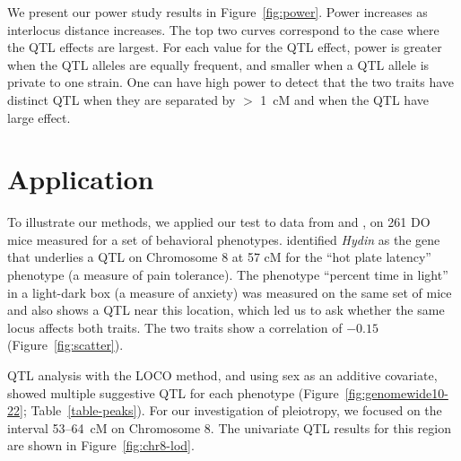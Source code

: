 \documentclass[12pt,twoside, lineno]{gsajnl}
\begin{document}
We present our power study results in Figure~\ref{fig:power}.
Power increases as interlocus distance increases. The top two curves
correspond to the case where the QTL effects are largest. For each value
for the QTL effect, power is greater when the QTL alleles are equally
frequent, and smaller when a QTL allele is private to one strain. One
can have high power to detect that the two traits have distinct QTL
when they are separated by $>$ 1~cM and when the QTL have large effect.


\section{Application}
\label{sec:app}

To illustrate our methods, we applied our test to data from
\citet{logan2013high} and \citet{recla2014precise}, on 261 DO mice
measured for a set of behavioral phenotypes.
\citet{recla2014precise} identified \textit{Hydin} as the gene that
underlies a QTL on Chromosome 8 at 57 cM for the ``hot plate latency''
phenotype (a measure of pain tolerance). The phenotype ``percent time in light''
in a light-dark box (a measure of anxiety) was
measured on the same set of mice \citep{logan2013high} and also shows a QTL near
this location, which led us to ask whether the same locus affects both traits.
The two traits show a correlation of $-0.15$ (Figure~\ref{fig:scatter}).

QTL analysis with the LOCO method, and using sex as an additive
covariate, showed multiple suggestive QTL for each
phenotype (Figure~\ref{fig:genomewide10-22}; Table~\ref{table-peaks}). For our investigation of
pleiotropy, we focused on the interval 53--64~cM on Chromosome 8.
The univariate QTL results for this region are shown in
Figure~\ref{fig:chr8-lod}.
\end{document}
